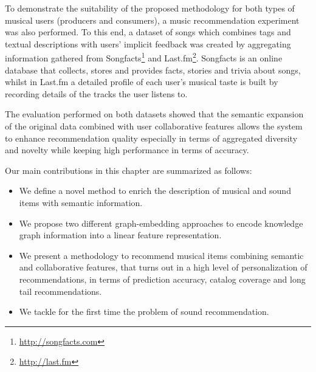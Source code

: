 To demonstrate the suitability of the proposed methodology for both types of musical users (producers and consumers), a music recommendation experiment was also performed. To this end, a dataset of songs which combines tags and textual descriptions with users' implicit feedback was created by aggregating information gathered from Songfacts\footnote{\url{http://songfacts.com}} and Last.fm\footnote{\url{http://last.fm}}. Songfacts is an online database that collects, stores and provides facts, stories and trivia about songs, whilst in Last.fm a detailed profile of each user's musical taste is built by recording details of the tracks the user listens to.

The evaluation performed on both datasets showed that the semantic expansion of the original data combined with user collaborative features allows the system to enhance recommendation quality especially in terms of aggregated diversity and novelty while keeping high performance in terms of accuracy. %

Our main contributions in this chapter are summarized as follows:
\begin{itemize}
\item{We define a novel method to enrich the description of musical and sound items with semantic information.}
\item{We propose two different graph-embedding approaches to encode knowledge graph information into a linear feature representation.}
\item{We present a methodology to recommend musical items combining semantic and collaborative features, that turns out in a high level of personalization of recommendations, in terms of prediction accuracy, catalog coverage and long tail recommendations.}
\item{We tackle for the first time the problem of sound recommendation.}
\end{itemize}


